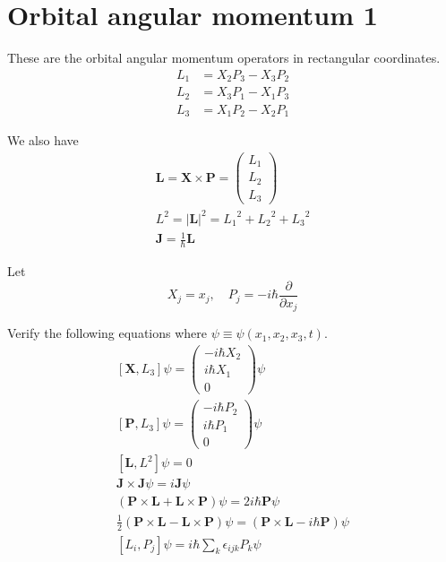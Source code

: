 

\section*{Orbital angular momentum 1}

These are the orbital angular momentum operators in rectangular coordinates.
\begin{align*}
L_1&=X_2P_3-X_3P_2
\\
L_2&=X_3P_1-X_1P_3
\\
L_3&=X_1P_2-X_2P_1
\end{align*}

We also have
\begin{gather*}
\mathbf L=\mathbf X\times\mathbf P
=\begin{pmatrix}
L_1
\\
L_2
\\
L_3
\end{pmatrix}
\\[1ex]
L^2=|\mathbf L|^2={L_1}^2+{L_2}^2+{L_3}^2
\\[1ex]
\mathbf J=\frac{1}{\hbar}\mathbf L
\end{gather*}

Let
\begin{equation*}
X_j=x_j,\quad P_j=-i\hbar\frac{\partial}{\partial x_j}
\end{equation*}

Verify the following equations where $\psi\equiv\psi(x_1,x_2,x_3,t)$.
\begin{gather*}
%
[\mathbf X,L_3]\psi
=\begin{pmatrix}
-i\hbar X_2
\\
i\hbar X_1
\\
0
\end{pmatrix}\psi
\tag{1}
\\[1ex]
%
[\mathbf P,L_3]\psi
=\begin{pmatrix}
-i\hbar P_2
\\
i\hbar P_1
\\
0
\end{pmatrix}\psi
\tag{2}
\\[1ex]
%
[\mathbf L,L^2]\psi=0
\tag{3}
\\[1ex]
%
\mathbf J\times\mathbf J\psi=i\mathbf J\psi
\tag{4}
\\[1ex]
%
(\mathbf P\times\mathbf L+\mathbf L\times\mathbf P)\psi=2i\hbar\mathbf P\psi
\tag{5}
\\[1ex]
%
\tfrac{1}{2}(\mathbf P\times\mathbf L-\mathbf L\times\mathbf P)\psi
=(\mathbf P\times\mathbf L-i\hbar\mathbf P)\psi
\tag{6}
\\[1ex]
%
[L_i,P_j]\psi=i\hbar\sum_k\epsilon_{ijk}P_k\psi
\tag{7}
\end{gather*}


